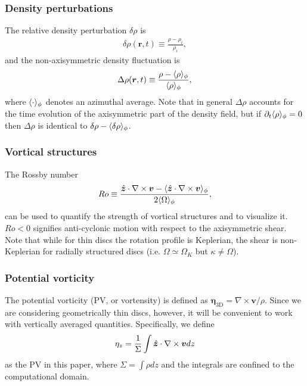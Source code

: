 \subsubsection{Density perturbations}
The relative density perturbation $\delta\rho$ is 
\begin{align}
  \delta\rho(\bm{r},t) \equiv \frac{\rho - \rho_i}{\rho_i}, 
\end{align}
and the non-axisymmetric density fluctuation is 
\begin{align}
  \Delta\rho(\bm{r},t) \equiv \frac{\rho -
    \langle \rho \rangle_\phi}{\langle \rho \rangle_\phi}, 
\end{align}
where $\langle \cdot \rangle_\phi$ denotes an azimuthal average.  
Note that in general $\Delta\rho$ accounts for the time evolution of
the axisymmetric part of the density field, but if
$\partial_t\langle \rho \rangle_\phi=0$ then $\Delta\rho$ is identical to
$\delta\rho-\langle \delta\rho \rangle_\phi$.   

\subsubsection{Vortical structures}
The Rossby number
\begin{align}
  Ro \equiv
  \frac{\hat{\bm{z}}\cdot\nabla\times\bm{v}-\langle \hat{\bm{z}}\cdot\nabla\times\bm{v} \rangle_\phi}{2\langle \Omega \rangle_\phi},   
\end{align} 
can be used to quantify the strength of vortical structures and to
visualize it. $Ro<0$ signifies anti-cyclonic motion with respect to
the axisymmetric shear. Note that while for thin discs the rotation
profile is Keplerian, the shear is non-Keplerian for radially  
structured discs (i.e. $\Omega\simeq\Omega_K$ but
$\kappa\neq\Omega$). 

\subsubsection{Potential vorticity}
The potential vorticity (PV, or vortensity) is defined as
$  \bm{\eta}_\mathrm{3D} = \nabla\times\bm{v}/\rho. $
Since we are considering geometrically thin discs, however, it will be
convenient to work with vertically averaged quantities. Specifically,
we define 
\begin{align}
  \eta_z = \frac{1}{\Sigma}\int \hat{\bm{z}}\cdot\nabla\times\bm{v} dz
\end{align}
as the PV in this paper, where $\Sigma = \int\rho dz$ and the
integrals are confined to the computational domain. 

